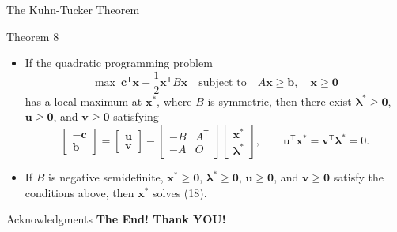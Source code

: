 \documentclass[aspectratio=169,hyperref,UTF8,CJK]{beamer}
\newcommand{\trans}{\mathsf{T}}
\newcommand{\vect}[1]{\boldsymbol{#1}}
\begin{document}
\begin{frame}{The Kuhn-Tucker Theorem}
  \scriptsize
  \begin{block}{Theorem 8}
    \begin{itemize}
      \item If the quadratic programming problem
        \begin{equation}\tag{18}
          \max\ \vect{c}^{\trans}\vect{x}+\frac12\vect{x}^{\trans}B\vect{x}
          \quad\text{subject to}\quad A\vect{x}\ge\vect{b},\quad\vect{x}\ge\vect{0}
        \end{equation}
        has a local maximum at $\vect{x}^{*}$, where $B$ is symmetric, then there exist $\vect{\lambda}^{*}\ge\vect{0}$, $\vect{u}\ge\vect{0}$, and $\vect{v}\ge\vect{0}$ satisfying
        \begin{equation*}
          \begin{bmatrix}-\vect{c}\\\vect{b}\end{bmatrix}
          =\begin{bmatrix}\vect{u}\\\vect{v}\end{bmatrix}
          -\begin{bmatrix}-B&A^{\trans}\\-A&O\end{bmatrix}
          \begin{bmatrix}\vect{x}^{*}\\\vect{\lambda}^{*}\end{bmatrix},
          \qquad
          \vect{u}^{\trans}\vect{x}^{*}=\vect{v}^{\trans}\vect{\lambda}^{*}=0.
        \end{equation*}
      \item If $B$ is negative semidefinite, $\vect{x}^{*}\ge\vect{0}$, $\vect{\lambda}^{*}\ge\vect{0}$, $\vect{u}\ge\vect{0}$, and $\vect{v}\ge\vect{0}$ satisfy the conditions above, then $\vect{x}^{*}$ solves (18).
    \end{itemize}
  \end{block}
\end{frame}

\begin{frame}{Acknowledgments}
  \centering
  \vfill
  {\Huge\color{blue}\textbf{The End! Thank YOU!}}
  \vfill
\end{frame}
\end{document}
